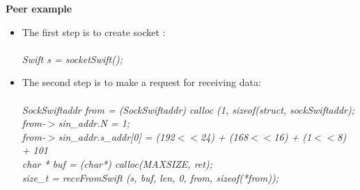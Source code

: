 \textbf{Peer example}
\begin{itemize}
 \item The first step is to create socket :\\\\
\small{\emph{
\hspace*{1cm}	Swift s = socketSwift();
}}
 \item The second step is to make a request for receiving data:\\\\
\small{\emph{
\hspace*{1cm}	SockSwiftaddr from =  (SockSwiftaddr) calloc (1, sizeof(struct, sockSwiftaddr);\\
\hspace*{1cm}	from-$>$sin_addr.N = 1;\\
\hspace*{1cm}	from-$>$sin_addr.s_addr[0] = (192$<<$24) + (168$<<$16) + (1$<<$8) + 101\\
\hspace*{1cm}	char * buf = (char*) calloc(MAXSIZE, ret);\\
\hspace*{1cm}	size_t = recvFromSwift (s, buf, len, 0, from, sizeof(*from));\\
}}
\end{itemize}
